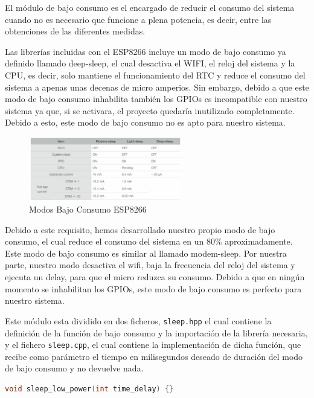 El módulo de bajo consumo es el encargado de reducir el consumo del sistema cuando no es necesario que funcione a plena potencia, es decir, entre las obtenciones de las diferentes medidas.


Las librerías incluidas con el ESP8266 incluye un modo de bajo consumo ya definido llamado deep-sleep, el cual desactiva el WIFI, el reloj del sistema y la CPU, es decir, solo mantiene el funcionamiento del RTC y reduce el consumo del sistema a apenas unas decenas de micro amperios. Sin embargo, debido a que este modo de bajo consumo inhabilita también los GPIOs es incompatible con nuestro sistema ya que, si se activara, el proyecto quedaría inutilizado completamente. Debido a esto, este modo de bajo consumo no es apto para nuestro sistema.

\begin{figure}[H]
    \centering
    \includegraphics[width=0.6\textwidth]{images/3-software/3-2-5-lowpower/Modos Bajo Consumo.png}
    \caption{Modos Bajo Consumo ESP8266}
    \label{fig:3-2-5-1-ModosBajoConsumo}
\end{figure}

Debido a este requisito, hemos desarrollado nuestro propio modo de bajo consumo, el cual reduce el consumo del sistema en un 80\% aproximadamente. Este modo de bajo consumo es similar al llamado modem-sleep. Por nuestra parte, nuestro modo desactiva el wifi, baja la frecuencia del reloj del sistema y ejecuta un delay, para que el micro reduzca su consumo. Debido a que en ningún momento se inhabilitan los GPIOs, este modo de bajo consumo es perfecto para nuestro sistema.


Este módulo esta dividido en dos ficheros, \texttt{sleep.hpp} el cual contiene la definición de la función de bajo consumo y la importación de la librería necesaria, y el fichero \texttt{sleep.cpp}, el cual contiene la implementación de dicha función, que recibe como parámetro el tiempo en milisegundos deseado de duración del modo de bajo consumo y no devuelve nada.

\begin{lstlisting}[captionpos=b, caption={Función bajo consumo}, language=c++]
    void sleep_low_power(int time_delay) {}
\end{lstlisting}

